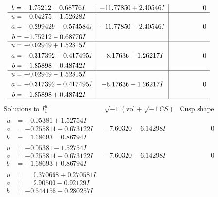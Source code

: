 \documentclass[1p]{elsarticle_modified}
\theoremstyle{definition}
\newcommand{\I}{\sqrt{-1}}
\begin{document}
$$\begin{array}{c|c|c}
\begin{aligned}
b &= -1.75212 + 0.68776 I\end{aligned}
 & -11.77850 + 2.40546 I & \phantom{-0.000000 } 0 \\ \hline\begin{aligned}
u &= \phantom{-}0.04275 - 1.52628 I \\
a &= -0.299429 + 0.574584 I \\
b &= -1.75212 - 0.68776 I\end{aligned}
 & -11.77850 - 2.40546 I & \phantom{-0.000000 } 0 \\ \hline\begin{aligned}
u &= -0.02949 + 1.52815 I \\
a &= -0.317392 + 0.417495 I \\
b &= -1.85898 - 0.48742 I\end{aligned}
 & -8.17636 + 1.26217 I & \phantom{-0.000000 } 0 \\ \hline\begin{aligned}
u &= -0.02949 - 1.52815 I \\
a &= -0.317392 - 0.417495 I \\
b &= -1.85898 + 0.48742 I\end{aligned}
 & -8.17636 - 1.26217 I & \phantom{-0.000000 } 0\\
 \hline 
 \end{array}$$\newpage$$\begin{array}{c|c|c}  
\text{Solutions to }I^u_{1}& \I (\text{vol} + \sqrt{-1}CS) & \text{Cusp shape}\\
 \hline 
\begin{aligned}
u &= -0.05381 + 1.52754 I \\
a &= -0.255814 + 0.673122 I \\
b &= -1.68693 - 0.86794 I\end{aligned}
 & -7.60320 - 6.14298 I & \phantom{-0.000000 } 0 \\ \hline\begin{aligned}
u &= -0.05381 - 1.52754 I \\
a &= -0.255814 - 0.673122 I \\
b &= -1.68693 + 0.86794 I\end{aligned}
 & -7.60320 + 6.14298 I & \phantom{-0.000000 } 0 \\ \hline\begin{aligned}
u &= \phantom{-}0.370668 + 0.270581 I \\
a &= \phantom{-}2.90500 - 0.92129 I \\
b &= -0.644155 - 0.280257 I\end{aligned}

\end{array}$$
\end{document}

